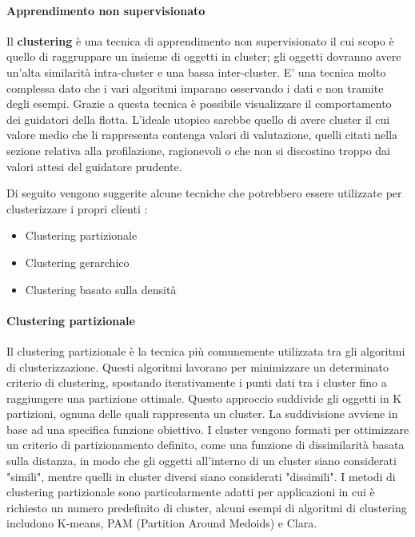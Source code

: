 \documentclass[12pt, a4paper, italian]{report}
\numberwithin{figure}{chapter}
\numberwithin{table}{chapter}
\begin{document}
\paragraph{Apprendimento non supervisionato}
Il \textbf{clustering} è una tecnica di apprendimento non supervisionato il cui scopo è quello di raggruppare un insieme di oggetti in cluster; gli oggetti dovranno avere un'alta similarità intra-cluster e una bassa inter-cluster. E' una tecnica molto complessa dato che i vari algoritmi imparano osservando i dati e non tramite degli esempi. Grazie a questa tecnica è possibile visualizzare il comportamento dei guidatori della flotta. L'ideale utopico sarebbe quello di avere cluster il cui valore medio che li rappresenta contenga valori di valutazione, quelli citati nella sezione relativa alla profilazione, ragionevoli o che non si discostino troppo dai valori attesi del guidatore prudente.

\vspace{0.5cm}
Di seguito vengono suggerite alcune tecniche che potrebbero essere utilizzate per clusterizzare i propri clienti \cite{popat2014review}: 

\begin{itemize}
    \item Clustering partizionale
    \item Clustering gerarchico
    \item Clustering basato sulla densità
\end{itemize}

\paragraph{Clustering partizionale} 
Il clustering partizionale è la tecnica più comunemente utilizzata tra gli algoritmi di clusterizzazione. Questi algoritmi lavorano per minimizzare un determinato criterio di clustering, spostando iterativamente i punti dati tra i cluster fino a raggiungere una partizione ottimale. Questo approccio suddivide gli oggetti in K partizioni, ognuna delle quali rappresenta un cluster. La suddivisione avviene in base ad una specifica funzione obiettivo. I cluster vengono formati per ottimizzare un criterio di partizionamento definito, come una funzione di dissimilarità basata sulla distanza, in modo che gli oggetti all'interno di un cluster siano considerati "simili", mentre quelli in cluster diversi siano considerati "dissimili". I metodi di clustering partizionale sono particolarmente adatti per applicazioni in cui è richiesto un numero predefinito di cluster, alcuni esempi di algoritmi di clustering includono K-means, PAM (Partition Around Medoids) e Clara.
\end{document}
